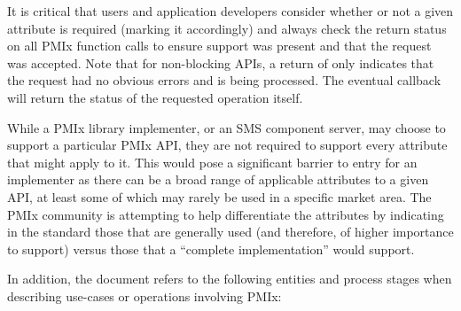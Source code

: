 \adviceuserstart
It is critical that users and application developers consider whether or not a given attribute is required (marking it accordingly) and always check the return status on all \ac{PMIx} function calls to ensure support was present and that the request was accepted. Note that for non-blocking \acp{API}, a return of  only indicates that the request had no obvious errors and is being processed. The eventual callback will return the status of the requested operation itself.
\adviceuserend

While a \ac{PMIx} library implementer, or an \ac{SMS} component server, may choose to support a particular \ac{PMIx} \ac{API}, they are not required to support every attribute that might apply to it. This would pose a significant barrier to entry for an implementer as there can be a broad range of applicable attributes to a given \ac{API}, at least some of which may rarely be used in a specific market area. The \ac{PMIx} community is attempting to help differentiate the attributes by indicating in the standard those that are generally used (and therefore, of higher importance to support) versus those that a ``complete implementation'' would support.

In addition, the document refers to the following entities and process stages when describing use-cases or operations involving \ac{PMIx}:

